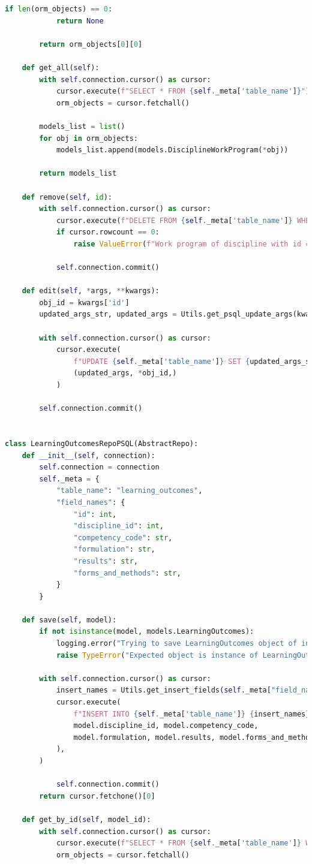 \begin{lstlisting}[label=lst:db-postgresql, caption=Листинг модуля взаимодействия c СУБД PostgreSQL, language=python]
		if len(orm_objects) == 0:
			return None
	
		return orm_objects[0][0]
	
	def get_all(self):
		with self.connection.cursor() as cursor:
			cursor.execute(f"SELECT * FROM {self._meta['table_name']}")
			orm_objects = cursor.fetchall()
	
		models_list = list()
		for obj in orm_objects:
			models_list.append(models.DisciplineWorkProgram(*obj))
	
		return models_list
		
	def remove(self, id):
		with self.connection.cursor() as cursor:
			cursor.execute(f"DELETE FROM {self._meta['table_name']} WHERE id = %s", (id,))
			if cursor.rowcount == 0:
				raise ValueError(f"Work program of discipline with id = {id} doesn't exists.")
	
			self.connection.commit()
	
	def edit(self, *args, **kwargs):
		obj_id = kwargs['id']
		updated_args_str, updated_args = Utils.get_psql_update_args(kwargs['fields'])
	
		with self.connection.cursor() as cursor:
			cursor.execute(
				f"UPDATE {self._meta['table_name']} SET {updated_args_str} WHERE id = %s",
				(updated_args, *obj_id,)
			)
	
		self.connection.commit()


class LearningOutcomesRepoPSQL(AbstractRepo):
	def __init__(self, connection):
		self.connection = connection
		self._meta = {
			"table_name": "learning_outcomes",
			"field_names": {
				"id": int,
				"discipline_id": int,
				"competency_code": str,
				"formulation": str,
				"results": str,
				"forms_and_methods": str,
			}
		}
	
	def save(self, model):
		if not isinstance(model, models.LearningOutcomes):
			logging.error("Trying to save LearningOutcomes object of invalid type")
			raise TypeError("Expected object is instance of LearningOutcomes")
		
		with self.connection.cursor() as cursor:
			insert_names = Utils.get_insert_fields(self._meta["field_names"])
			cursor.execute(
				f"INSERT INTO {self._meta['table_name']} {insert_names} VALUES (%s, %s, %s, %s, %s) RETURNING id", (
				model.discipline_id, model.competency_code,
				model.formulation, model.results, model.forms_and_methods
			),
		)
		
			self.connection.commit()
		return cursor.fetchone()[0]
	
	def get_by_id(self, model_id):
		with self.connection.cursor() as cursor:
			cursor.execute(f"SELECT * FROM {self._meta['table_name']} WHERE id = %s", (model_id,))
			orm_objects = cursor.fetchall()
		

\end{lstlisting}
